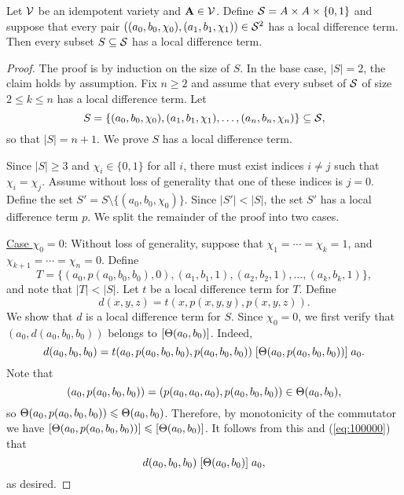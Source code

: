 \begin{thm} %
  \label{thm:local-diff-terms}
  Let $\mathcal{V}$ be an idempotent variety and
  $\mathbf{A} \in \mathcal{V}$. Define
  $\mathcal{S}= A \times A \times \{0,1\}$
  and suppose that every pair
  $((a_0, b_0, \chi_0), (a_1, b_1, \chi_1)) \in \mathcal{S}^2$
  has a local difference term.
  Then every subset $S \subseteq \mathcal{S}$
  has a local difference term.
\end{thm}
\begin{proof}
The proof is by induction on the size of $S$.  In the base case, $|S| = 2$,
the claim holds by assumption.
Fix $n\geq 2$ and assume that every subset of $\mathcal{S}$ of size $2\leq k \leq n$ has a local
difference term. Let
\[
S = \{(a_0, b_0, \chi_0), (a_1, b_1, \chi_1), \dots, (a_{n}, b_{n},\chi_{n})\} \subseteq \mathcal{S},\]
so that $|S| = n+1$.  We prove $S$ has a local difference term.

Since $|S| \geq 3$ and $\chi_i \in \{0,1\}$ for all $i$, there must exist
indices $i\neq j$ such that $\chi_i = \chi_j$. Assume without loss of generality
that one of these indices is $j=0$.  Define
the set
$S' = S \setminus \{(a_0, b_0, \chi_0)\}$.
Since $|S'| < |S|$, the set $S'$ has a local difference term $p$.
We split the remainder of the proof into two cases.

\medskip

\noindent \underline{Case $\chi_0 = 0$}:
Without loss of generality, suppose that $\chi_1 = %
\cdots =\chi_k = 1$,
and $\chi_{k+1} %
= \cdots = \chi_{n} = 0$. Define %
\[T = \{(a_0, p(a_0, b_0, b_0), 0),
(a_1, b_1, 1), (a_2, b_2, 1), 
\dots, (a_k, b_k, 1)\},\] and 
note that $|T| < |S|$.
Let $t$ be a local difference term for $T$.
Define
\[
d(x,y,z) = t(x, p(x,y,y), p(x,y,z)).
\]
We show that $d$ is a local difference term for $S$.
Since $\chi_0 =0$, we first verify that
$(a_0, d(a_0,b_0,b_0))$ belongs to $[\Theta(a_0,b_0)]$.
Indeed,
\begin{equation}
    \label{eq:100000}
  d(a_0,b_0,b_0) =
  t(a_0, p(a_0,b_0,b_0), p(a_0,b_0,b_0))\Comr{\Cg(a_0, p(a_0,b_0,b_0))} a_0.
\end{equation}
Note that
\[(a_0, p(a_0,b_0,b_0)) = (p(a_0,a_0,a_0), p(a_0,b_0,b_0)) \in \Theta(a_0, b_0),\]
so $\Theta(a_0, p(a_0,b_0,b_0))\leqslant \Theta(a_0,b_0)$. Therefore,
by monotonicity of the commutator we have
$[\Theta(a_0, p(a_0,b_0,b_0))] \leqslant [\Theta(a_0,b_0)]$.
It follows from this and (\ref{eq:100000}) that
\[d(a_0,b_0,b_0)\mathrel{[\Theta(a_0,b_0)]} a_0,\]
as desired.


\end{proof}
